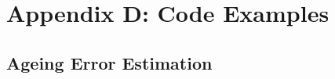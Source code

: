 \section{Appendix D: Code Examples}
\label{sec:codeappendix}

\subsection{Ageing Error Estimation}
\hypertarget{AgeingError}{}


